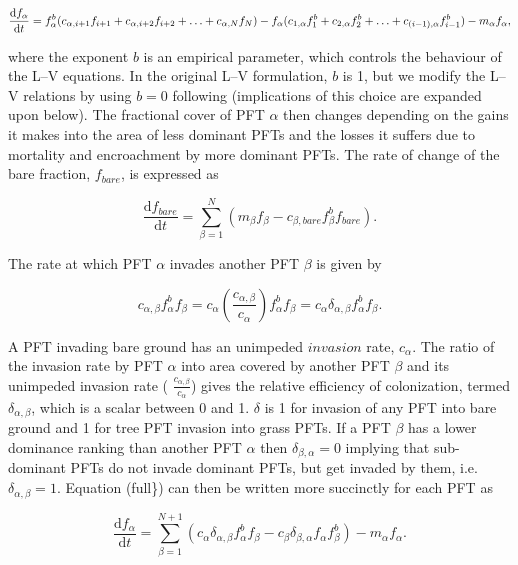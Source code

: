 \[ \frac{\mathrm{d}f_\alpha}{\mathrm{d}t} = f^b_\alpha(c_{\alpha, i+1}f_{i+1} +c_{\alpha, i+2}f_{i+2} +\ldots+c_{\alpha,N}f_{N})\nonumber\\ - f_\alpha(c_{1,\alpha}f^b_1 + c_{2,\alpha}f^b_2 + \ldots + c_{(i-1),\alpha}f^b_{i-1})\nonumber\\ - m_{\alpha} f_\alpha,\label{full} \]

where the exponent $b$ is an empirical parameter, which controls the behaviour of the L--V equations. In the original L--V formulation, $b$ is 1, but we modify the L--V relations by using $b = 0$ following \cite{Arora2006-pp} \cite{Arora2006-ax} (implications of this choice are expanded upon below). The fractional cover of P\+F\+T $\alpha$ then changes depending on the gains it makes into the area of less dominant P\+F\+Ts and the losses it suffers due to mortality and encroachment by more dominant P\+F\+Ts. The rate of change of the bare fraction, $f_{bare}$, is expressed as

\[ \label{barecol} \frac{\mathrm{d}f_{bare}}{\mathrm{d}t} = \sum_{\beta=1}^{N}(m_\beta f_\beta - c_{\beta, {bare}}f^b_\beta f_{bare}). \]

The rate at which P\+F\+T $\alpha$ invades another P\+F\+T $\beta$ is given by

\[ \label{coloniz} c_{\alpha,\beta}f^b_\alpha f_{\beta} = c_\alpha\left(\frac{c_{\alpha,\beta}}{c_\alpha} \right)f^b_\alpha f_{\beta} = c_\alpha \delta_{\alpha,\beta} f^b_\alpha f_{\beta}. \]

A P\+F\+T invading bare ground has an unimpeded $\textit{invasion}$ rate, $c_\alpha$. The ratio of the invasion rate by P\+F\+T $\alpha$ into area covered by another P\+F\+T $\beta$ and its unimpeded invasion rate ( $\frac{c_{\alpha,\beta}}{c_\alpha}$) gives the relative efficiency of colonization, termed $\delta_{\alpha,\beta}$, which is a scalar between 0 and 1. $\delta$ is 1 for invasion of any P\+F\+T into bare ground and 1 for tree P\+F\+T invasion into grass P\+F\+Ts. If a P\+F\+T $\beta$ has a lower dominance ranking than another P\+F\+T $\alpha$ then $\delta_{\beta,\alpha}=0$ implying that sub-\/dominant P\+F\+Ts do not invade dominant P\+F\+Ts, but get invaded by them, i.\+e. $\delta_{\alpha,\beta}=1$. Equation (full\}) can then be written more succinctly for each P\+F\+T as

\[ \label{compact} \frac{\mathrm{d}f_\alpha}{\mathrm{d}t} = \sum_{\beta=1}^{N+1} (c_{\alpha} \delta_{\alpha,\beta}f^b_\alpha f_\beta - c_{\beta} \delta_{\beta,\alpha} f_\alpha f^b_\beta) - m_{\alpha} f_\alpha. \]

